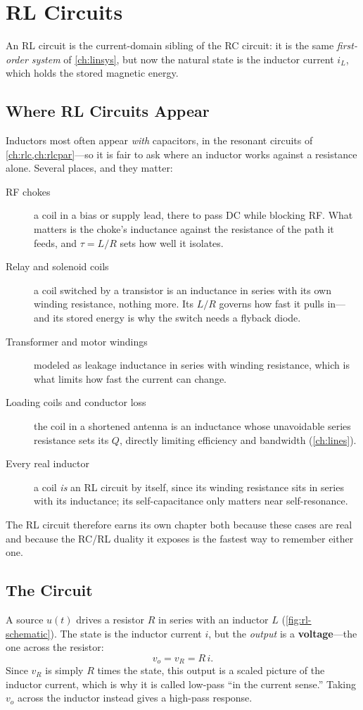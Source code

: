 \chapter{RL Circuits}
\label{ch:rl}
An RL circuit is the current-domain sibling of the RC circuit: it is the same
\emph{first-order system} of \cref{ch:linsys}, but now the natural state is the
inductor current \(i_L\), which holds the stored magnetic energy.

\section{Where RL Circuits Appear}
Inductors most often appear \emph{with} capacitors, in the resonant circuits of
\cref{ch:rlc,ch:rlcpar}---so it is fair to ask where an inductor works against a
resistance alone. Several places, and they matter:
\begin{description}
\item[RF chokes] a coil in a bias or supply lead, there to pass DC while blocking
RF. What matters is the choke's inductance against the resistance of the path it
feeds, and \(\tau=L/R\) sets how well it isolates.
\item[Relay and solenoid coils] a coil switched by a transistor is an inductance in
series with its own winding resistance, nothing more. Its \(L/R\) governs how fast
it pulls in---and its stored energy is why the switch needs a flyback diode.
\item[Transformer and motor windings] modeled as leakage inductance in series with
winding resistance, which is what limits how fast the current can change.
\item[Loading coils and conductor loss] the coil in a shortened antenna is an
inductance whose unavoidable series resistance sets its \(Q\), directly limiting
efficiency and bandwidth (\cref{ch:lines}).
\item[Every real inductor] a coil \emph{is} an RL circuit by itself, since its
winding resistance sits in series with its inductance; its self-capacitance only
matters near self-resonance.
\end{description}
The RL circuit therefore earns its own chapter both because these cases are real and
because the RC/RL duality it exposes is the fastest way to remember either one.

\section{The Circuit}
A source \(u(t)\) drives a resistor \(R\) in series with an inductor \(L\)
(\cref{fig:rl-schematic}). The state is the inductor current \(i\), but the
\emph{output} is a \textbf{voltage}---the one across the resistor:
\[
v_o=v_R=R\,i .
\]
Since \(v_R\) is simply \(R\) times the state, this output is a scaled picture of
the inductor current, which is why it is called low-pass ``in the current sense.''
Taking \(v_o\) across the inductor instead gives a high-pass response.

